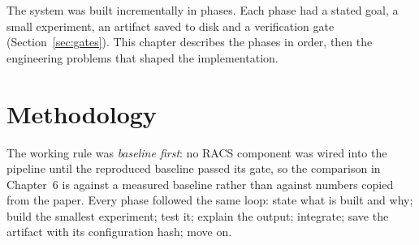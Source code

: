 The system was built incrementally in phases. Each phase had a stated goal, a small
experiment, an artifact saved to disk and a verification gate (Section~\ref{sec:gates}). This
chapter describes the phases in order, then the engineering problems that shaped the
implementation.

\section{Methodology}
The working rule was \emph{baseline first}: no RACS component was wired into the pipeline until
the reproduced baseline passed its gate, so the comparison in Chapter~6 is against a measured
baseline rather than against numbers copied from the paper. Every phase followed the same loop:
state what is built and why; build the smallest experiment; test it; explain the output;
integrate; save the artifact with its configuration hash; move on.

